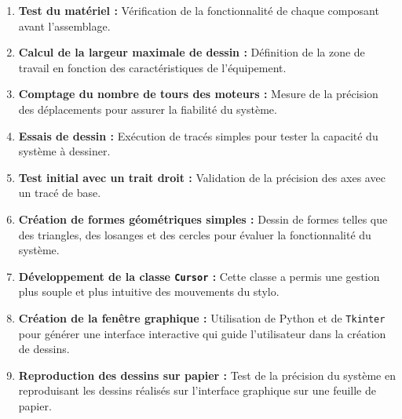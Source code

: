\documentclass[12pt,a4paper]{article}
\begin{document}
\begin{enumerate}
    \item \textbf{Test du matériel :} Vérification de la fonctionnalité de chaque composant avant l'assemblage.
    \item \textbf{Calcul de la largeur maximale de dessin :} Définition de la zone de travail en fonction des caractéristiques de l’équipement.
    \item \textbf{Comptage du nombre de tours des moteurs :} Mesure de la précision des déplacements pour assurer la fiabilité du système.
    \item \textbf{Essais de dessin :} Exécution de tracés simples pour tester la capacité du système à dessiner.
    \item \textbf{Test initial avec un trait droit :} Validation de la précision des axes avec un tracé de base.
    \item \textbf{Création de formes géométriques simples :} Dessin de formes telles que des triangles, des losanges et des cercles pour évaluer la fonctionnalité du système.
    \item \textbf{Développement de la classe \texttt{Cursor} :} Cette classe a permis une gestion plus souple et plus intuitive des mouvements du stylo.
    \item \textbf{Création de la fenêtre graphique :} Utilisation de Python et de \texttt{Tkinter} pour générer une interface interactive qui guide l’utilisateur dans la création de dessins.
    \item \textbf{Reproduction des dessins sur papier :} Test de la précision du système en reproduisant les dessins réalisés sur l'interface graphique sur une feuille de papier.
\end{enumerate}
\end{document}
